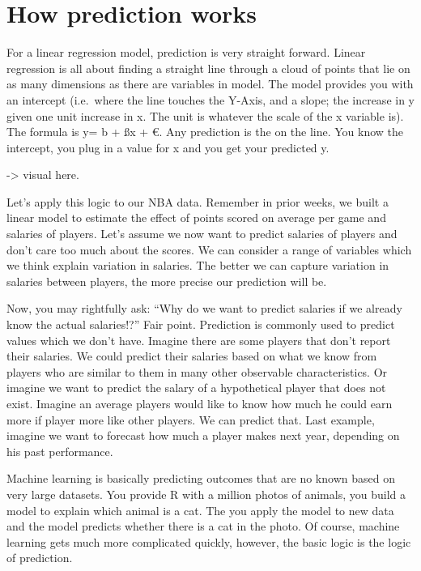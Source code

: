 \documentclass[
]{book}
\begin{document}
\hypertarget{how-prediction-works}{%
\section{How prediction works}\label{how-prediction-works}}

For a linear regression model, prediction is very straight forward. Linear regression is all about finding a straight line through a cloud of points that lie on as many dimensions as there are variables in model. The model provides you with an intercept (i.e.~where the line touches the Y-Axis, and a slope; the increase in y given one unit increase in x. The unit is whatever the scale of the x variable is). The formula is y= b + ßx + €. Any prediction is the on the line. You know the intercept, you plug in a value for x and you get your predicted y.

-\textgreater{} visual here.

Let's apply this logic to our NBA data. Remember in prior weeks, we built a linear model to estimate the effect of points scored on average per game and salaries of players. Let's assume we now want to predict salaries of players and don't care too much about the scores. We can consider a range of variables which we think explain variation in salaries. The better we can capture variation in salaries between players, the more precise our prediction will be.

Now, you may rightfully ask: ``Why do we want to predict salaries if we already know the actual salaries!?'' Fair point. Prediction is commonly used to predict values which we don't have. Imagine there are some players that don't report their salaries. We could predict their salaries based on what we know from players who are similar to them in many other observable characteristics. Or imagine we want to predict the salary of a hypothetical player that does not exist. Imagine an average players would like to know how much he could earn more if player more like other players. We can predict that. Last example, imagine we want to forecast how much a player makes next year, depending on his past performance.

Machine learning is basically predicting outcomes that are no known based on very large datasets. You provide R with a million photos of animals, you build a model to explain which animal is a cat. The you apply the model to new data and the model predicts whether there is a cat in the photo. Of course, machine learning gets much more complicated quickly, however, the basic logic is the logic of prediction.
\end{document}
